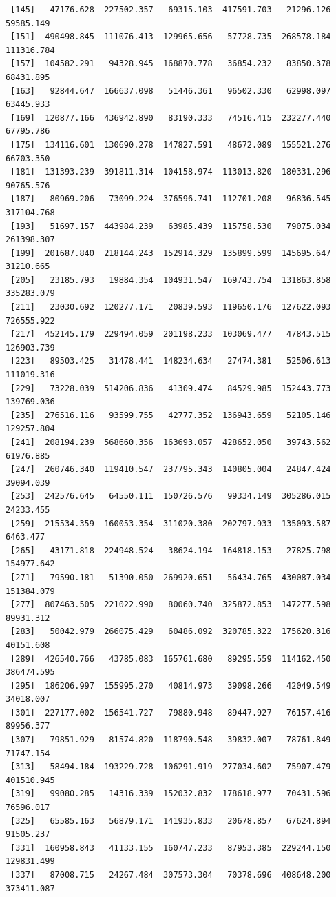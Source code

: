\documentclass[
  letterpaper,
  DIV=11,
  numbers=noendperiod]{scrartcl}
\begin{document}
\begin{verbatim}
 [145]   47176.628  227502.357   69315.103  417591.703   21296.126   59585.149
 [151]  490498.845  111076.413  129965.656   57728.735  268578.184  111316.784
 [157]  104582.291   94328.945  168870.778   36854.232   83850.378   68431.895
 [163]   92844.647  166637.098   51446.361   96502.330   62998.097   63445.933
 [169]  120877.166  436942.890   83190.333   74516.415  232277.440   67795.786
 [175]  134116.601  130690.278  147827.591   48672.089  155521.276   66703.350
 [181]  131393.239  391811.314  104158.974  113013.820  180331.296   90765.576
 [187]   80969.206   73099.224  376596.741  112701.208   96836.545  317104.768
 [193]   51697.157  443984.239   63985.439  115758.530   79075.034  261398.307
 [199]  201687.840  218144.243  152914.329  135899.599  145695.647   31210.665
 [205]   23185.793   19884.354  104931.547  169743.754  131863.858  335283.079
 [211]   23030.692  120277.171   20839.593  119650.176  127622.093  726555.922
 [217]  452145.179  229494.059  201198.233  103069.477   47843.515  126903.739
 [223]   89503.425   31478.441  148234.634   27474.381   52506.613  111019.316
 [229]   73228.039  514206.836   41309.474   84529.985  152443.773  139769.036
 [235]  276516.116   93599.755   42777.352  136943.659   52105.146  129257.804
 [241]  208194.239  568660.356  163693.057  428652.050   39743.562   61976.885
 [247]  260746.340  119410.547  237795.343  140805.004   24847.424   39094.039
 [253]  242576.645   64550.111  150726.576   99334.149  305286.015   24233.455
 [259]  215534.359  160053.354  311020.380  202797.933  135093.587    6463.477
 [265]   43171.818  224948.524   38624.194  164818.153   27825.798  154977.642
 [271]   79590.181   51390.050  269920.651   56434.765  430087.034  151384.079
 [277]  807463.505  221022.990   80060.740  325872.853  147277.598   89931.312
 [283]   50042.979  266075.429   60486.092  320785.322  175620.316   40151.608
 [289]  426540.766   43785.083  165761.680   89295.559  114162.450  386474.595
 [295]  186206.997  155995.270   40814.973   39098.266   42049.549   34018.007
 [301]  227177.002  156541.727   79880.948   89447.927   76157.416   89956.377
 [307]   79851.929   81574.820  118790.548   39832.007   78761.849   71747.154
 [313]   58494.184  193229.728  106291.919  277034.602   75907.479  401510.945
 [319]   99080.285   14316.339  152032.832  178618.977   70431.596   76596.017
 [325]   65585.163   56879.171  141935.833   20678.857   67624.894   91505.237
 [331]  160958.843   41133.155  160747.233   87953.385  229244.150  129831.499
 [337]   87008.715   24267.484  307573.304   70378.696  408648.200  373411.087

\end{verbatim}
\end{document}
